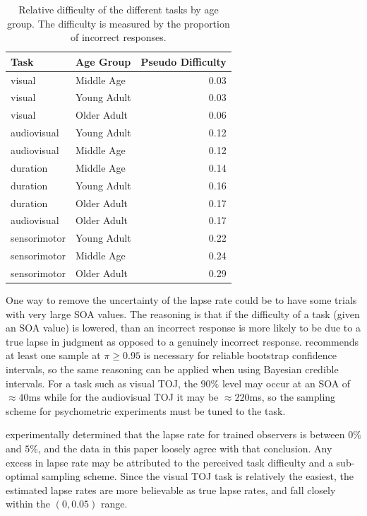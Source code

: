 \documentclass[11pt, oneside, openany]{scrbook}
\begin{document}
\begin{table}[!h]

\caption{\label{tab:ch050-Orange-Tigerfish}Relative difficulty of the different tasks by age group. The difficulty is measured by the proportion of incorrect responses.}
\centering
\begin{tabular}[t]{llr}
\toprule
Task & Age Group & Pseudo Difficulty\\
\midrule
visual & Middle Age & 0.03\\
visual & Young Adult & 0.03\\
visual & Older Adult & 0.06\\
audiovisual & Young Adult & 0.12\\
audiovisual & Middle Age & 0.12\\
\addlinespace
duration & Middle Age & 0.14\\
duration & Young Adult & 0.16\\
duration & Older Adult & 0.17\\
audiovisual & Older Adult & 0.17\\
sensorimotor & Young Adult & 0.22\\
\addlinespace
sensorimotor & Middle Age & 0.24\\
sensorimotor & Older Adult & 0.29\\
\bottomrule
\end{tabular}
\end{table}

One way to remove the uncertainty of the lapse rate could be to have some trials with very large SOA values. The reasoning is that if the difficulty of a task (given an SOA value) is lowered, than an incorrect response is more likely to be due to a true lapse in judgment as opposed to a genuinely incorrect response. \citet{wichmann2001b} recommends at least one sample at \(\pi \ge 0.95\) is necessary for reliable bootstrap confidence intervals, so the same reasoning can be applied when using Bayesian credible intervals. For a task such as visual TOJ, the \(90\%\) level may occur at an SOA of \(\approx 40\)ms while for the audiovisual TOJ it may be \(\approx 220\)ms, so the sampling scheme for psychometric experiments must be tuned to the task.

\citet{wichmann2001a} experimentally determined that the lapse rate for trained observers is between \(0\%\) and \(5\%\), and the data in this paper loosely agree with that conclusion. Any excess in lapse rate may be attributed to the perceived task difficulty and a sub-optimal sampling scheme. Since the visual TOJ task is relatively the easiest, the estimated lapse rates are more believable as true lapse rates, and fall closely within the \((0, 0.05)\) range.
\end{document}
